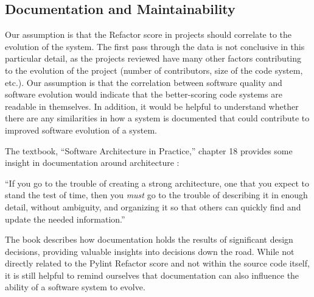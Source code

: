 \subsection{Documentation and Maintainability} \label{subDocumentation}


Our assumption is that the Refactor score in projects should correlate to the evolution of the system. The first pass through the data is not conclusive in this particular detail, as the projects reviewed have many other factors contributing to the evolution of the project (number of contributors, size of the code system, etc.). Our assumption is that the correlation between software quality and software evolution would indicate that the better-scoring code systems are readable in themselves. In addition, it would be helpful to understand whether there are any similarities in how a system is documented that could contribute to improved software evolution of a system.




The textbook, ``Software Architecture in Practice,'' chapter 18 provides some insight in documentation around architecture \cite{book:software-architecture-in-practice}:

\vspace{0.25cm}
\begin{displayquote}
``If you go to the trouble of creating a strong architecture, one that you expect to stand the test of time, then you \textit{must} go to the trouble of describing it in enough detail, without ambiguity, and organizing it so that others can quickly find and update the needed information.''
\end{displayquote}
\vspace{0.25cm}

The book describes how documentation holds the results of significant design decisions, providing valuable insights into decisions down the road. While not directly related to the Pylint Refactor score and not within the source code itself, it is still helpful to remind ourselves that documentation can also influence the ability of a software system to evolve.

